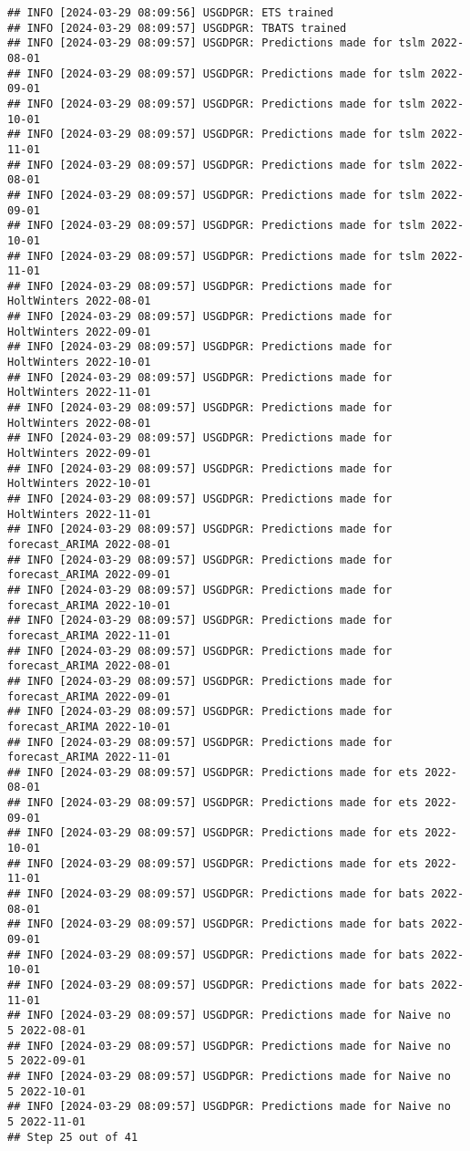 \documentclass[
]{article}
\begin{document}
\begin{verbatim}
## INFO [2024-03-29 08:09:56] USGDPGR: ETS trained
## INFO [2024-03-29 08:09:57] USGDPGR: TBATS trained
## INFO [2024-03-29 08:09:57] USGDPGR: Predictions made for tslm 2022-08-01
## INFO [2024-03-29 08:09:57] USGDPGR: Predictions made for tslm 2022-09-01
## INFO [2024-03-29 08:09:57] USGDPGR: Predictions made for tslm 2022-10-01
## INFO [2024-03-29 08:09:57] USGDPGR: Predictions made for tslm 2022-11-01
## INFO [2024-03-29 08:09:57] USGDPGR: Predictions made for tslm 2022-08-01
## INFO [2024-03-29 08:09:57] USGDPGR: Predictions made for tslm 2022-09-01
## INFO [2024-03-29 08:09:57] USGDPGR: Predictions made for tslm 2022-10-01
## INFO [2024-03-29 08:09:57] USGDPGR: Predictions made for tslm 2022-11-01
## INFO [2024-03-29 08:09:57] USGDPGR: Predictions made for HoltWinters 2022-08-01
## INFO [2024-03-29 08:09:57] USGDPGR: Predictions made for HoltWinters 2022-09-01
## INFO [2024-03-29 08:09:57] USGDPGR: Predictions made for HoltWinters 2022-10-01
## INFO [2024-03-29 08:09:57] USGDPGR: Predictions made for HoltWinters 2022-11-01
## INFO [2024-03-29 08:09:57] USGDPGR: Predictions made for HoltWinters 2022-08-01
## INFO [2024-03-29 08:09:57] USGDPGR: Predictions made for HoltWinters 2022-09-01
## INFO [2024-03-29 08:09:57] USGDPGR: Predictions made for HoltWinters 2022-10-01
## INFO [2024-03-29 08:09:57] USGDPGR: Predictions made for HoltWinters 2022-11-01
## INFO [2024-03-29 08:09:57] USGDPGR: Predictions made for forecast_ARIMA 2022-08-01
## INFO [2024-03-29 08:09:57] USGDPGR: Predictions made for forecast_ARIMA 2022-09-01
## INFO [2024-03-29 08:09:57] USGDPGR: Predictions made for forecast_ARIMA 2022-10-01
## INFO [2024-03-29 08:09:57] USGDPGR: Predictions made for forecast_ARIMA 2022-11-01
## INFO [2024-03-29 08:09:57] USGDPGR: Predictions made for forecast_ARIMA 2022-08-01
## INFO [2024-03-29 08:09:57] USGDPGR: Predictions made for forecast_ARIMA 2022-09-01
## INFO [2024-03-29 08:09:57] USGDPGR: Predictions made for forecast_ARIMA 2022-10-01
## INFO [2024-03-29 08:09:57] USGDPGR: Predictions made for forecast_ARIMA 2022-11-01
## INFO [2024-03-29 08:09:57] USGDPGR: Predictions made for ets 2022-08-01
## INFO [2024-03-29 08:09:57] USGDPGR: Predictions made for ets 2022-09-01
## INFO [2024-03-29 08:09:57] USGDPGR: Predictions made for ets 2022-10-01
## INFO [2024-03-29 08:09:57] USGDPGR: Predictions made for ets 2022-11-01
## INFO [2024-03-29 08:09:57] USGDPGR: Predictions made for bats 2022-08-01
## INFO [2024-03-29 08:09:57] USGDPGR: Predictions made for bats 2022-09-01
## INFO [2024-03-29 08:09:57] USGDPGR: Predictions made for bats 2022-10-01
## INFO [2024-03-29 08:09:57] USGDPGR: Predictions made for bats 2022-11-01
## INFO [2024-03-29 08:09:57] USGDPGR: Predictions made for Naive no  5 2022-08-01
## INFO [2024-03-29 08:09:57] USGDPGR: Predictions made for Naive no  5 2022-09-01
## INFO [2024-03-29 08:09:57] USGDPGR: Predictions made for Naive no  5 2022-10-01
## INFO [2024-03-29 08:09:57] USGDPGR: Predictions made for Naive no  5 2022-11-01
## Step 25 out of 41
\end{verbatim}
\end{document}
